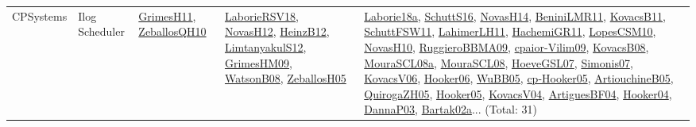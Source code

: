 {\begin{longtable}{lp{3cm}>{\raggedright}p{6cm}>{\raggedright}p{6cm}p{8cm}}
CPSystems & Ilog Scheduler & \href{papers/GrimesH11.pdf}{GrimesH11}\cite{GrimesH11}, \href{articles/ZeballosQH10.pdf}{ZeballosQH10}\cite{ZeballosQH10} & \href{articles/LaborieRSV18.pdf}{LaborieRSV18}\cite{LaborieRSV18}, \href{articles/NovasH12.pdf}{NovasH12}\cite{NovasH12}, \href{papers/HeinzB12.pdf}{HeinzB12}\cite{HeinzB12}, \href{articles/LimtanyakulS12.pdf}{LimtanyakulS12}\cite{LimtanyakulS12}, \href{papers/GrimesHM09.pdf}{GrimesHM09}\cite{GrimesHM09}, \href{papers/WatsonB08.pdf}{WatsonB08}\cite{WatsonB08}, \href{articles/ZeballosH05.pdf}{ZeballosH05}\cite{ZeballosH05} & \href{papers/Laborie18a.pdf}{Laborie18a}\cite{Laborie18a}, \href{papers/SchuttS16.pdf}{SchuttS16}\cite{SchuttS16}, \href{articles/NovasH14.pdf}{NovasH14}\cite{NovasH14}, \href{articles/BeniniLMR11.pdf}{BeniniLMR11}\cite{BeniniLMR11}, \href{articles/KovacsB11.pdf}{KovacsB11}\cite{KovacsB11}, \href{articles/SchuttFSW11.pdf}{SchuttFSW11}\cite{SchuttFSW11}, \href{papers/LahimerLH11.pdf}{LahimerLH11}\cite{LahimerLH11}, \href{articles/HachemiGR11.pdf}{HachemiGR11}\cite{HachemiGR11}, \href{articles/LopesCSM10.pdf}{LopesCSM10}\cite{LopesCSM10}, \href{articles/NovasH10.pdf}{NovasH10}\cite{NovasH10}, \href{articles/RuggieroBBMA09.pdf}{RuggieroBBMA09}\cite{RuggieroBBMA09}, \href{papers/cpaior-Vilim09.pdf}{cpaior-Vilim09}\cite{cpaior-Vilim09}, \href{articles/KovacsB08.pdf}{KovacsB08}\cite{KovacsB08}, \href{papers/MouraSCL08a.pdf}{MouraSCL08a}\cite{MouraSCL08a}, \href{papers/MouraSCL08.pdf}{MouraSCL08}\cite{MouraSCL08}, \href{papers/HoeveGSL07.pdf}{HoeveGSL07}\cite{HoeveGSL07}, \href{articles/Simonis07.pdf}{Simonis07}\cite{Simonis07}, \href{papers/KovacsV06.pdf}{KovacsV06}\cite{KovacsV06}, \href{articles/Hooker06.pdf}{Hooker06}\cite{Hooker06}, \href{papers/WuBB05.pdf}{WuBB05}\cite{WuBB05}, \href{papers/cp-Hooker05.pdf}{cp-Hooker05}\cite{cp-Hooker05}, \href{papers/ArtiouchineB05.pdf}{ArtiouchineB05}\cite{ArtiouchineB05}, \href{papers/QuirogaZH05.pdf}{QuirogaZH05}\cite{QuirogaZH05}, \href{articles/Hooker05.pdf}{Hooker05}\cite{Hooker05}, \href{papers/KovacsV04.pdf}{KovacsV04}\cite{KovacsV04}, \href{papers/ArtiguesBF04.pdf}{ArtiguesBF04}\cite{ArtiguesBF04}, \href{papers/Hooker04.pdf}{Hooker04}\cite{Hooker04}, \href{papers/DannaP03.pdf}{DannaP03}\cite{DannaP03}, \href{papers/Bartak02a.pdf}{Bartak02a}\cite{Bartak02a}... (Total: 31)\\

\end{longtable}}

